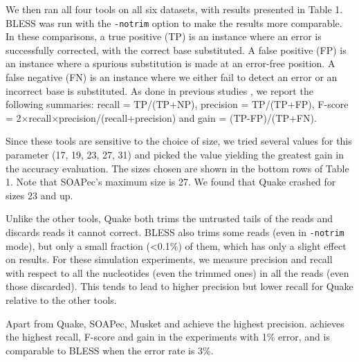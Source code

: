 \documentclass{bmcart}
\begin{document}
We then ran all four tools on all six datasets, with results presented in Table 1.  BLESS was run with the \verb+-notrim+ option to make the results more comparable. In these comparisons, a true positive (TP) is an instance where an error is successfully corrected, \thatis with the correct base substituted.  A false positive (FP) is an instance where a spurious substitution is made at an error-free position.  A false negative (FN) is an instance where we either fail to detect an error or an incorrect base is substituted.  As done in previous studies \cite{liu2013musket}, we report the following summaries: recall = TP/(TP$+$NP), precision = TP/(TP$+$FP), F-score = 2$\times$recall$\times$precision/(recall$+$precision) and gain = (TP-FP)/(TP+FN). 

Since these tools are sensitive to the choice of \kmer size, we tried several values for this parameter (17, 19, 23, 27, 31) and picked the value yielding the greatest gain in the accuracy evaluation.  The \kmer sizes chosen are shown in the bottom rows of Table 1.  Note that SOAPec's maximum \kmer size is 27.  We found that Quake crashed for \kmer sizes 23 and up.


Unlike the other tools, Quake both trims the untrusted tails of the reads and discards reads it cannot correct. BLESS also trims some reads (even in \verb+-notrim+ mode), but only a small fraction (\textless0.1\%) of them, which has only a slight effect on results.  For these simulation experiments, we measure precision and recall with respect to all the nucleotides (even the trimmed ones) in all the reads (even those discarded).  This tends to lead to higher precision but lower recall for Quake relative to the other tools.


Apart from Quake, SOAPec, Musket and \tool achieve the highest precision.  \tool achieves the highest recall, F-score and gain in the experiments with 1\% error, and is comparable to BLESS when the error rate is 3\%.
\end{document}
